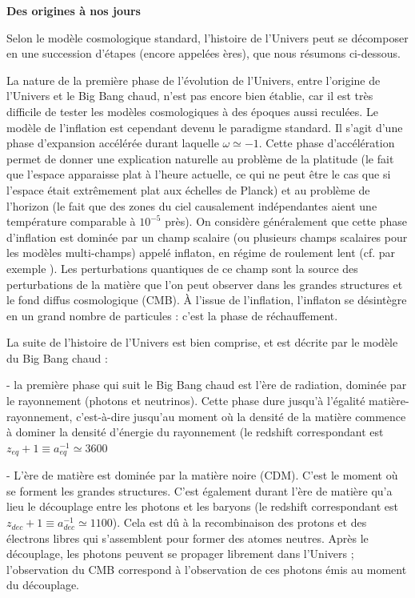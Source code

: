 \documentclass[a4paper,12pt]{report}
\theoremstyle{plain}
\theoremstyle{plain}
\begin{document}
{\bf Des origines \`a nos jours}

Selon le mod\`ele cosmologique standard, l'histoire de l'Univers peut se d\'ecomposer en
une succession d'\'etapes (encore appel\'ees \`eres), que nous r\'esumons ci-dessous.

La nature de la premi\`ere phase de l'\'evolution de l'Univers, entre l'origine de l'Univers et
le Big Bang chaud, n'est pas encore bien \'etablie, car il est tr\`es difficile de tester les mod\`eles
cosmologiques \`a des \'epoques aussi recul\'ees. Le mod\`ele de l'inflation est cependant devenu
le paradigme standard. Il s'agit d'une phase d'expansion acc\'el\'er\'ee durant laquelle $  \omega \simeq -1 $.
Cette phase d'acc\'el\'eration permet de donner une explication naturelle au probl\`eme de la
platitude (le fait que l'espace apparaisse plat \`a l'heure actuelle, ce qui ne peut \^etre le cas que
si l'espace \'etait extr\^emement plat aux \'echelles de Planck) et au probl\`eme de l'horizon (le fait
que des zones du ciel causalement ind\'ependantes aient une temp\'erature comparable \`a  $ 10^{-5}$
pr\`es). On consid\`ere g\'en\'eralement que cette phase d'inflation est domin\'ee par un champ
scalaire (ou plusieurs champs scalaires pour les mod\`eles multi-champs) appel\'e inflaton, en
r\'egime de roulement lent (cf. par exemple \cite{215}). Les perturbations quantiques
de ce champ sont la source des perturbations de la mati\`ere que l'on peut observer dans les
grandes structures et le fond diffus cosmologique (CMB). \`A l'issue de l'inflation, l'inflaton
se d\'esint\`egre en un grand nombre de particules : c'est la phase de r\'echauffement.

La suite de l'histoire de l'Univers est bien comprise, et est d\'ecrite par le mod\`ele du Big
Bang chaud :

- la premi\`ere phase qui suit le Big Bang chaud est l'\`ere de radiation, domin\'ee par
le rayonnement (photons et neutrinos). Cette phase dure jusqu'\`a l'\'egalit\'e mati\`ere-rayonnement, 
c'est-\`a-dire jusqu'au moment o\`u la densit\'e de la mati\`ere commence \`a
dominer la densit\'e d'\'energie du rayonnement (le redshift correspondant est $z_{eq} + 1  \equiv a_{eq}^{-1} \simeq 3600 $

- L'\`ere de mati\`ere est domin\'ee par la mati\`ere noire (CDM). C'est le moment o\`u
se forment les grandes structures. C'est \'egalement durant l'\`ere de mati\`ere qu'a
lieu le d\'ecouplage entre les photons et les baryons (le redshift correspondant est
  $z_{dec} + 1  \equiv a_{dec}^{-1} \simeq 1100 $).
 Cela est d\^u \`a la recombinaison des protons et des 
 \'electrons libres qui s'assemblent pour former des atomes neutres. Apr\`es le d\'ecouplage,
les photons peuvent se propager librement dans l'Univers ; l'observation du CMB
correspond \`a l'observation de ces photons \'emis au moment du d\'ecouplage.
\end{document}
